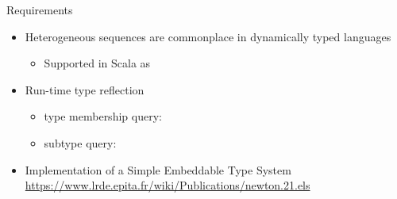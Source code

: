 \begin{frame}{Requirements}
  \begin{itemize}
  \item Heterogeneous sequences are commonplace in dynamically typed languages
    \begin{itemize}
    \item Supported in Scala as 
    \end{itemize}
  \item Run-time type reflection 
    \begin{itemize}
    \item type membership query:
    \item subtype query: 
    \end{itemize}
  \item Implementation of a Simple Embeddable Type System
    \url{https://www.lrde.epita.fr/wiki/Publications/newton.21.els}
  \end{itemize}
\end{frame}
